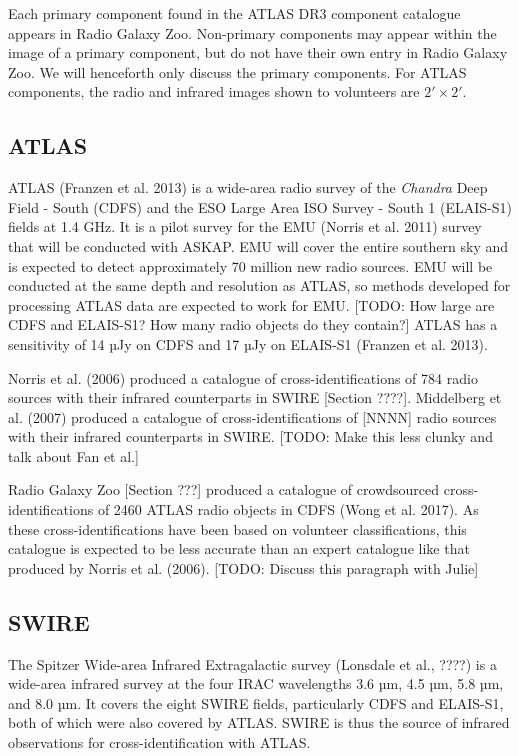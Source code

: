 \documentclass[fleqn,usenatbib,usedcolumn]{mnras}
\begin{document}
    Each primary component found in the ATLAS DR3 component catalogue
    appears in Radio Galaxy Zoo. Non-primary components may appear within
    the image of a primary component, but do not have their own entry in
    Radio Galaxy Zoo. We will henceforth only discuss the primary
    components. For ATLAS components, the radio and infrared images shown to
    volunteers are \(2' \times 2'\).

  \subsection{ATLAS}\label{atlas}

    ATLAS (Franzen et al. 2013) is a wide-area radio survey of the
    \emph{Chandra} Deep Field - South (CDFS) and the ESO Large Area ISO
    Survey - South 1 (ELAIS-S1) fields at 1.4 GHz. It is a pilot survey for
    the EMU (Norris et al. 2011) survey that will be conducted with ASKAP.
    EMU will cover the entire southern sky and is expected to detect
    approximately 70 million new radio sources. EMU will be conducted at the
    same depth and resolution as ATLAS, so methods developed for processing
    ATLAS data are expected to work for EMU. {[}TODO: How large are CDFS and
    ELAIS-S1? How many radio objects do they contain?{]} ATLAS has a
    sensitivity of 14 µJy on CDFS and 17 µJy on ELAIS-S1 (Franzen et al.
    2013).

    Norris et al. (2006) produced a catalogue of cross-identifications of
    784 radio sources with their infrared counterparts in SWIRE {[}Section
    ????{]}. Middelberg et al. (2007) produced a catalogue of
    cross-identifications of {[}NNNN{]} radio sources with their infrared
    counterparts in SWIRE. {[}TODO: Make this less clunky and talk about Fan
    et al.{]}

    Radio Galaxy Zoo {[}Section ???{]} produced a catalogue of crowdsourced
    cross-identifications of 2460 ATLAS radio objects in CDFS (Wong et al.
    2017). As these cross-identifications have been based on volunteer
    classifications, this catalogue is expected to be less accurate than an
    expert catalogue like that produced by Norris et al. (2006). {[}TODO:
    Discuss this paragraph with Julie{]}

  \subsection{SWIRE}\label{swire}

    The Spitzer Wide-area Infrared Extragalactic survey (Lonsdale et al.,
    ????) is a wide-area infrared survey at the four IRAC wavelengths 3.6
    µm, 4.5 µm, 5.8 µm, and 8.0 µm. It covers the eight SWIRE fields,
    particularly CDFS and ELAIS-S1, both of which were also covered by
    ATLAS. SWIRE is thus the source of infrared observations for
    cross-identification with ATLAS.
\end{document}

